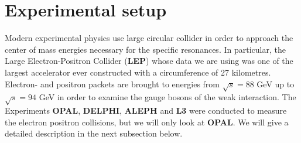 \section{Experimental setup}
\label{sec:experimental_setup_}
Modern experimental physics use large circular collider in order to approach the center of mass energies necessary for the
specific resonances. In particular, the Large Electron-Positron Collider (\textbf{LEP}) whose data we are using was one
of the largest accelerator ever constructed with a circumference of 27 kilometres. Electron- and positron packets are brought
to energies from $\sqrt{s} = 88$ GeV up to $\sqrt{s} = 94$ GeV in order to examine the gauge bosons of the weak interaction. 
The Experiments \textbf{OPAL}, \textbf{DELPHI}, \textbf{ALEPH} and \textbf{L3} were conducted to measure the electron positron
collisions, but we will only look at \textbf{OPAL}. 
We will give a detailed description in the next
subsection below.


